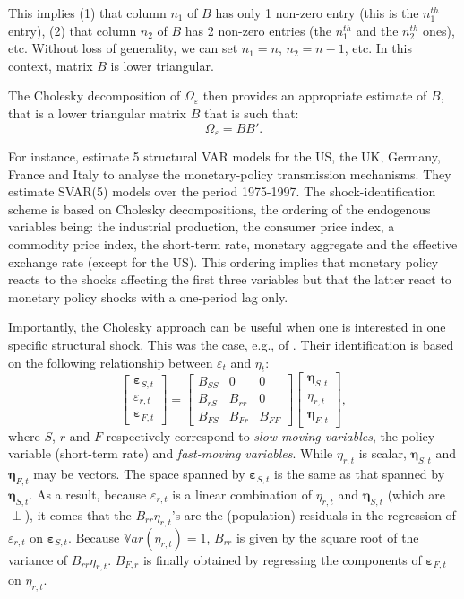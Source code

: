 \documentclass[
]{book}
\theoremstyle{definition}
\theoremstyle{definition}
\theoremstyle{definition}
\theoremstyle{definition}
\theoremstyle{remark}
\begin{document}
This implies (1) that column \(n_1\) of \(B\) has only 1 non-zero entry (this is the \(n_1^{th}\) entry), (2) that column \(n_2\) of \(B\) has 2 non-zero entries (the \(n_1^{th}\) and the \(n_2^{th}\) ones), etc. Without loss of generality, we can set \(n_1=n\), \(n_2=n-1\), etc. In this context, matrix \(B\) is lower triangular.

The Cholesky decomposition of \(\Omega_{\varepsilon}\) then provides an appropriate estimate of \(B\), that is a lower triangular matrix \(B\) that is such that:
\[
\Omega_\varepsilon = BB'.
\]

For instance, \citet{DEDOLA20051543} estimate 5 structural VAR models for the US, the UK, Germany, France and Italy to analyse the monetary-policy transmission mechanisms. They estimate SVAR(5) models over the period 1975-1997. The shock-identification scheme is based on Cholesky decompositions, the ordering of the endogenous variables being: the industrial production, the consumer price index, a commodity price index, the short-term rate, monetary aggregate and the effective exchange rate (except for the US). This ordering implies that monetary policy reacts to the shocks affecting the first three variables but that the latter react to monetary policy shocks with a one-period lag only.

Importantly, the Cholesky approach can be useful when one is interested in one specific structural shock. This was the case, e.g., of \citet{Christiano_Eichenbaum_Evans_1996}. Their identification is based on the following relationship between \(\varepsilon_t\) and \(\eta_t\):
\[
\left[\begin{array}{c}
\boldsymbol\varepsilon_{S,t}\\
\varepsilon_{r,t}\\
\boldsymbol\varepsilon_{F,t}
\end{array}\right] =
\left[\begin{array}{ccc}
B_{SS} & 0 & 0 \\
B_{rS} & B_{rr} & 0 \\
B_{FS} & B_{Fr} & B_{FF}
\end{array}\right]
\left[\begin{array}{c}
\boldsymbol\eta_{S,t}\\
\eta_{r,t}\\
\boldsymbol\eta_{F,t}
\end{array}\right],
\]
where \(S\), \(r\) and \(F\) respectively correspond to \emph{slow-moving variables}, the policy variable (short-term rate) and \emph{fast-moving variables}. While \(\eta_{r,t}\) is scalar, \(\boldsymbol\eta_{S,t}\) and \(\boldsymbol\eta_{F,t}\) may be vectors. The space spanned by \(\boldsymbol\varepsilon_{S,t}\) is the same as that spanned by \(\boldsymbol\eta_{S,t}\). As a result, because \(\varepsilon_{r,t}\) is a linear combination of \(\eta_{r,t}\) and \(\boldsymbol\eta_{S,t}\) (which are \(\perp\)), it comes that the \(B_{rr}\eta_{r,t}\)'s are the (population) residuals in the regression of \(\varepsilon_{r,t}\) on \(\boldsymbol\varepsilon_{S,t}\). Because \(\mathbb{V}ar(\eta_{r,t})=1\), \(B_{rr}\) is given by the square root of the variance of \(B_{rr}\eta_{r,t}\). \(B_{F,r}\) is finally obtained by regressing the components of \(\boldsymbol\varepsilon_{F,t}\) on \(\eta_{r,t}\).
\end{document}
